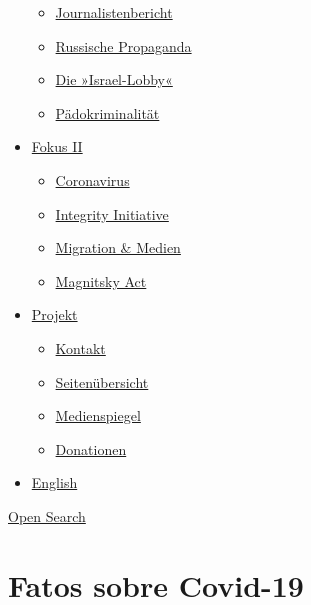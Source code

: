 \begin{itemize}
  \begin{itemize}
  \tightlist
  \item
    \href{https://swprs.org/bericht-eines-journalisten/}{Journalistenbericht}
  \item
    \href{https://swprs.org/russische-propaganda/}{Russische Propaganda}
  \item
    \href{https://swprs.org/die-israel-lobby-fakten-und-mythen/}{Die
    »Israel-Lobby«}
  \item
    \href{https://swprs.org/geopolitik-und-paedokriminalitaet/}{Pädokriminalität}
  \end{itemize}
\item
  \href{https://swprs.org/migration-und-medien/}{Fokus II}

  \begin{itemize}
  \tightlist
  \item
    \href{https://swprs.org/covid-19-hinweis-ii/}{Coronavirus}
  \item
    \href{https://swprs.org/die-integrity-initiative/}{Integrity
    Initiative}
  \item
    \href{https://swprs.org/migration-und-medien/}{Migration \& Medien}
  \item
    \href{https://swprs.org/der-fall-magnitsky/}{Magnitsky Act}
  \end{itemize}
\item
  \href{https://swprs.org/kontakt/}{Projekt}

  \begin{itemize}
  \tightlist
  \item
    \href{https://swprs.org/kontakt/}{Kontakt}
  \item
    \href{https://swprs.org/uebersicht/}{Seitenübersicht}
  \item
    \href{https://swprs.org/medienspiegel/}{Medienspiegel}
  \item
    \href{https://swprs.org/donationen/}{Donationen}
  \end{itemize}
\item
  \href{https://swprs.org/contact/}{English}
\end{itemize}

\protect\hyperlink{}{Open Search}

\hypertarget{fatos-sobre-covid-19}{%
\section{Fatos sobre Covid-19}\label{fatos-sobre-covid-19}}

